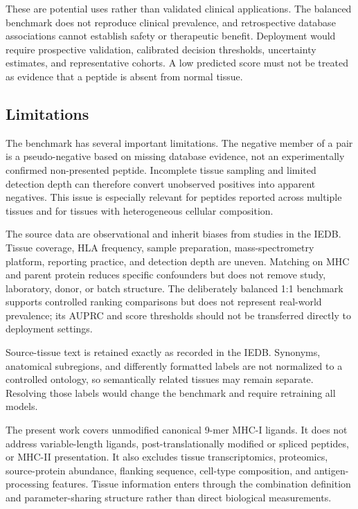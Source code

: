 These are potential uses rather than validated clinical applications. The balanced benchmark does not reproduce clinical prevalence, and retrospective database associations cannot establish safety or therapeutic benefit. Deployment would require prospective validation, calibrated decision thresholds, uncertainty estimates, and representative cohorts. A low predicted score must not be treated as evidence that a peptide is absent from normal tissue.

\subsection{Limitations}

The benchmark has several important limitations. The negative member of a pair is a pseudo-negative based on missing database evidence, not an experimentally confirmed non-presented peptide. Incomplete tissue sampling and limited detection depth can therefore convert unobserved positives into apparent negatives. This issue is especially relevant for peptides reported across multiple tissues and for tissues with heterogeneous cellular composition.

The source data are observational and inherit biases from studies in the IEDB. Tissue coverage, HLA frequency, sample preparation, mass-spectrometry platform, reporting practice, and detection depth are uneven. Matching on MHC and parent protein reduces specific confounders but does not remove study, laboratory, donor, or batch structure. The deliberately balanced 1:1 benchmark supports controlled ranking comparisons but does not represent real-world prevalence; its AUPRC and score thresholds should not be transferred directly to deployment settings.

Source-tissue text is retained exactly as recorded in the IEDB. Synonyms, anatomical subregions, and differently formatted labels are not normalized to a controlled ontology, so semantically related tissues may remain separate. Resolving those labels would change the benchmark and require retraining all models.

The present work covers unmodified canonical 9-mer MHC-I ligands. It does not address variable-length ligands, post-translationally modified or spliced peptides, or MHC-II presentation. It also excludes tissue transcriptomics, proteomics, source-protein abundance, flanking sequence, cell-type composition, and antigen-processing features. Tissue information enters through the combination definition and parameter-sharing structure rather than direct biological measurements.

